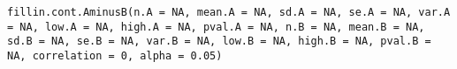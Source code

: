 \begin{Usage}
\begin{verbatim}
fillin.cont.AminusB(n.A = NA, mean.A = NA, sd.A = NA, se.A = NA, var.A = NA, low.A = NA, high.A = NA, pval.A = NA, n.B = NA, mean.B = NA, sd.B = NA, se.B = NA, var.B = NA, low.B = NA, high.B = NA, pval.B = NA, correlation = 0, alpha = 0.05)
\end{verbatim}
\end{Usage}
\begin{Arguments}
\begin{ldescription}
\item[\code{n.A}] 
\item[\code{mean.A}] 
\item[\code{sd.A}] 
\item[\code{se.A}] 
\item[\code{var.A}] 
\item[\code{low.A}] 
\item[\code{high.A}] 
\item[\code{pval.A}] 
\item[\code{n.B}] 
\item[\code{mean.B}] 
\item[\code{sd.B}] 
\item[\code{se.B}] 
\item[\code{var.B}] 
\item[\code{low.B}] 
\item[\code{high.B}] 
\item[\code{pval.B}] 
\item[\code{correlation}] 
\item[\code{alpha}] 
\end{ldescription}
\end{Arguments}
